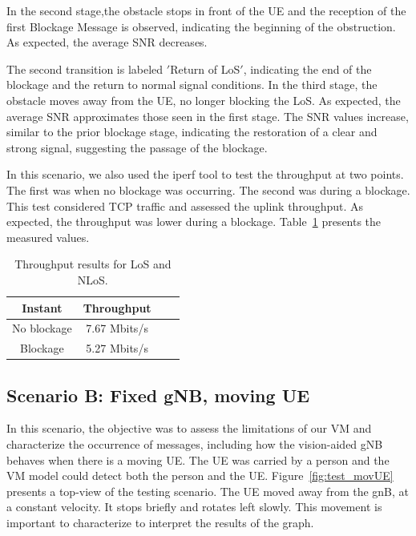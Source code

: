 In the second stage,the obstacle stops in front of the UE and the reception of the first Blockage Message is observed, indicating the beginning of the obstruction.
As expected, the average SNR decreases.

The second transition is labeled \('\)Return of LoS\('\), indicating the end of the blockage and the return to normal signal conditions.
In the third stage, the obstacle moves away from the UE, no longer blocking the LoS\@.
As expected, the average SNR approximates those seen in the first stage.
The SNR values increase, similar to the prior blockage stage, indicating the restoration of a clear and strong signal, suggesting the passage of the blockage.

In this scenario, we also used the iperf tool to test the throughput at two points.
The first was when no blockage was occurring.
The second was during a blockage.
This test considered TCP traffic and assessed the uplink throughput.
As expected, the throughput was lower during a blockage.
Table~\ref{tab:iperf} presents the measured values.


\begin{table}[h]
    \centering %
    \begin{tabular}{|c|c|c|c|}
        \hline
        \textbf{Instant} & \textbf{Throughput} \\ \hline
        No blockage & 7.67 Mbits/s \\ \hline
        Blockage   &  5.27 Mbits/s \\ \hline
    \end{tabular}
    \caption{Throughput results for LoS and NLoS.} %
    \label{tab:iperf} %
\end{table}


\subsection{Scenario B: Fixed gNB, moving UE}\label{subsec:scenario-0.1:-fixed-gnb-moving-ue}

In this scenario, the objective was to assess the limitations of our VM and characterize the occurrence of messages, including how the vision-aided gNB behaves when there is a moving UE\@.
The UE was carried by a person and the VM model could detect both the person and the UE\@.
Figure~\ref{fig:test_movUE} presents a top-view of the testing scenario.
The UE moved away from the gnB, at a constant velocity.
It stops briefly and rotates left slowly.
This movement is important to characterize to interpret the results of the graph.

